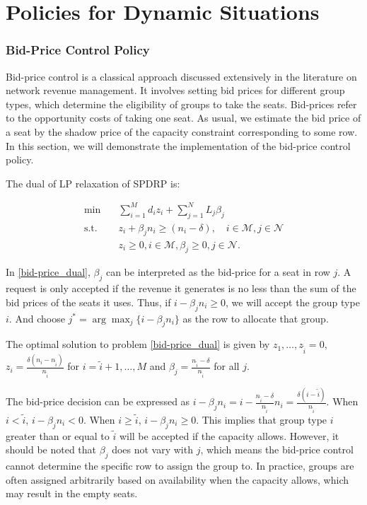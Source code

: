 \newpage
\section{Policies for Dynamic Situations}\label{policies}

\subsubsection*{Bid-Price Control Policy}
Bid-price control is a classical approach discussed extensively in the literature on network revenue management. It involves setting bid prices for different group types, which determine the eligibility of groups to take the seats. Bid-prices refer to the opportunity costs of taking one seat. As usual, we estimate the bid price of a seat by the shadow price of the capacity constraint corresponding to some row. In this section, we will demonstrate the implementation of the bid-price control policy. 

The dual of LP relaxation of SPDRP is:

\begin{equation}\label{bid-price_dual}
  \begin{aligned}
  \min \quad & \sum_{i=1}^{M} d_i z_i + \sum_{j= 1}^{N} L_j \beta_{j} \\
  \text {s.t.} \quad & z_{i} + \beta_j n_i \geq (n_i-\delta), \quad i \in \mathcal{M}, j \in \mathcal{N} \\
  & z_{i} \geq 0, i \in \mathcal{M}, \beta_{j} \geq 0, j \in \mathcal{N}.
  \end{aligned}
\end{equation}

In \eqref{bid-price_dual}, $\beta_{j}$ can be interpreted as the bid-price for a seat in row $j$. A request is only accepted if the revenue it generates is no less than the sum of the bid prices of the seats it uses. Thus, if $i -\beta_{j} n_i \geq 0$, we will accept the group type $i$. And choose $j^{*} = \arg \max_{j} \{i -\beta_{j} n_i\}$ as the row to allocate that group.


\begin{lem}\label{bid-price}
 The optimal solution to problem \eqref{bid-price_dual} is given by $z_1 ,\ldots, z_{\tilde{i}} =0$, $z_{i} = \frac{\delta(n_i-n_{\tilde{i}})}{n_{\tilde{i}}}$ for $i = \tilde{i}+1, \ldots, M$ and $\beta_j = \frac{n_{\tilde{i}} - \delta}{n_{\tilde{i}}}$ for all $j$.
\end{lem}

The bid-price decision can be expressed as $i - \beta_j n_i = i - \frac{n_{\tilde{i}} - \delta}{n_{\tilde{i}}} n_i = \frac{\delta (i - \tilde{i})}{n_{\tilde{i}}}$. When $i < \tilde{i}$, $i - \beta_j n_i < 0$. When $i \geq \tilde{i}$, $i - \beta_j n_i \geq 0$. This implies that group type $i$ greater than or equal to $\tilde{i}$ will be accepted if the capacity allows. However, it should be noted that $\beta_j$ does not vary with $j$, which means the bid-price control cannot determine the specific row to assign the group to. In practice, groups are often assigned arbitrarily based on availability when the capacity allows, which may result in the empty seats.

